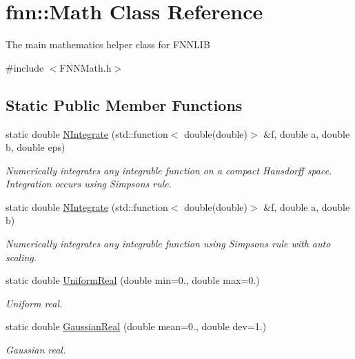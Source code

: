\hypertarget{classfnn_1_1_math}{}\section{fnn\+:\+:Math Class Reference}
\label{classfnn_1_1_math}


The main mathematics helper class for F\+N\+N\+L\+I\+B  




{\ttfamily \#include $<$F\+N\+N\+Math.\+h$>$}

\subsection*{Static Public Member Functions}
\begin{DoxyCompactItemize}
\item 
static double \hyperlink{classfnn_1_1_math_a22635237c10b30c61d0eadc944f0bd29}{N\+Integrate} (std\+::function$<$ double(double)$>$ \&f, double a, double b, double eps)
\begin{DoxyCompactList}\small\item\em Numerically integrates any integrable function on a compact Hausdorff space. Integration occurs using Simpson\textquotesingle{}s rule. \end{DoxyCompactList}\item 
static double \hyperlink{classfnn_1_1_math_a2480fe29e114e12d9927b3f79ac6fc43}{N\+Integrate} (std\+::function$<$ double(double)$>$ \&f, double a, double b)
\begin{DoxyCompactList}\small\item\em Numerically integrates any integrable function using Simpson\textquotesingle{}s rule with auto scaling. \end{DoxyCompactList}\item 
static double \hyperlink{classfnn_1_1_math_a4e6ce151aa117f06b758fd37b76bb7de}{Uniform\+Real} (double min=0., double max=0.)
\begin{DoxyCompactList}\small\item\em Uniform real. \end{DoxyCompactList}\item 
static double \hyperlink{classfnn_1_1_math_ad27de3d10960c2fd07ad68bccfffb192}{Gaussian\+Real} (double mean=0., double dev=1.)
\begin{DoxyCompactList}\small\item\em Gaussian real. \end{DoxyCompactList}\item 

\end{DoxyCompactItemize}
